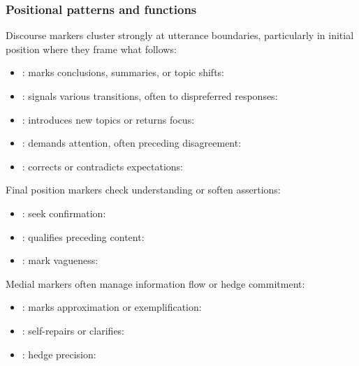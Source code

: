 \subsubsection*{Positional patterns and functions}

Discourse markers cluster strongly at utterance boundaries, particularly in initial position where they frame what follows:

\begin{itemize}[noitemsep]
   \item {}: marks conclusions, summaries, or topic shifts: 
   \item {}: signals various transitions, often to dispreferred responses: 
   \item {}: introduces new topics or returns focus: 
   \item {}: demands attention, often preceding disagreement: 
   \item {}: corrects or contradicts expectations: 
\end{itemize}

Final position markers check understanding or soften assertions:

\begin{itemize}[noitemsep]
   \item {}: seek confirmation: 
   \item {}: qualifies preceding content: 
   \item {}: mark vagueness: 
\end{itemize}

Medial markers often manage information flow or hedge commitment:

\begin{itemize}[noitemsep]
   \item {}: marks approximation or exemplification: 
   \item {}: self-repairs or clarifies: 
   \item {}: hedge precision: 
\end{itemize}

